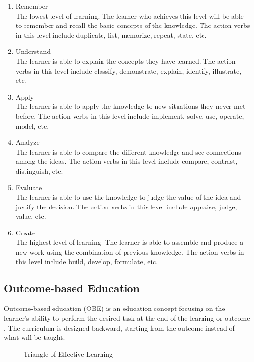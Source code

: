 \documentclass[12pt,oneside,openright,a4paper]{cpe-english-project}
\begin{document}
\begin{enumerate}
	\item Remember \\
	The lowest level of learning. The learner who achieves this level will be able to remember and recall the basic concepts of the knowledge. The action verbs in this level include duplicate, list, memorize, repeat, state, etc.
	\item Understand \\
	The learner is able to explain the concepts they have learned. The action verbs in this level include classify, demonstrate, explain, identify, illustrate, etc.
	\item Apply \\
	The learner is able to apply the knowledge to new situations they never met before. The action verbs in this level include implement, solve, use, operate, model, etc.
	\item Analyze \\
	The learner is able to compare the different knowledge and see connections among the ideas. The action verbs in this level include compare, contrast, distinguish, etc.
	\item Evaluate \\
	The learner is able to use the knowledge to judge the value of the idea and justify the decision. The action verbs in this level include appraise, judge, value, etc.
	\item Create \\
	The highest level of learning. The learner is able to assemble and produce a new work using the combination of previous knowledge. The action verbs in this level include build, develop, formulate, etc.
\end{enumerate}


\subsection{Outcome-based Education}
Outcome-based education (OBE) is an education concept focusing on the learner's ability to perform the desired task at the end of the learning or outcome \cite{kmuttobe}. The curriculum is designed backward, starting from the outcome instead of what will be taught.

\begin{figure}[!h]\centering
{}
\caption[Triangle of Effective Learning]{Triangle of Effective Learning \cite{kmuttobe}}
\label{fig:theory-OBE}
\end{figure}
\end{document}
